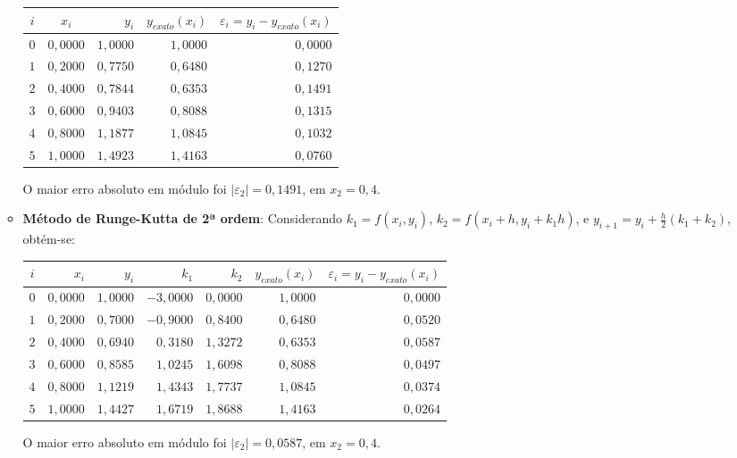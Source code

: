 \documentclass[12pt,a4paper]{article}
\begin{document}
\begin{enumerate}
\begin{itemize}
\medskip
\begin{center}
\begin{tabular}{ccrrr}
\hline
$i$ & $x_i$ & $y_i$ & $y_{exato}(x_i)$ & $\varepsilon_i = y_i-y_{exato}(x_i)$ \\ \hline
$0$ & $0,0000$ & $1,0000$ & $1,0000$ & $0,0000$ \\
$1$ & $0,2000$ & $0,7750$ & $0,6480$ & $0,1270$ \\
$2$ & $0,4000$ & $0,7844$ & $0,6353$ & $0,1491$ \\
$3$ & $0,6000$ & $0,9403$ & $0,8088$ & $0,1315$ \\
$4$ & $0,8000$ & $1,1877$ & $1,0845$ & $0,1032$ \\
$5$ & $1,0000$ & $1,4923$ & $1,4163$ & $0,0760$ \\
\hline
\end{tabular}
\end{center}
\medskip
O maior erro absoluto em módulo foi $|\varepsilon_2| = 0,1491$, em $x_2 = 0,4$.

\item \textbf{Método de Runge-Kutta de 2ª ordem}: Considerando
$k_1 = f(x_i, y_i)$,
$k_2 = f(x_i + h, y_i + k_1 h)$, e
$y_{i+1} = y_i + \frac{h}{2} (k_1 + k_2)$, obtém-se:
\medskip
\begin{center}
    \begin{tabular}{crrrrrr}
    \hline
      $i$ & $x_i$  & $y_i$ & $k_1$ & $k_2$ & $y_{exato}(x_i)$
      & $\varepsilon_i = y_i-y_{exato}(x_i)$ \\ \hline
    $0$ & $0,0000$ & $1,0000$ & $-3,0000$ & $0,0000$ & $1,0000$ & $0,0000$ \\
    $1$ & $0,2000$ & $0,7000$ & $-0,9000$ & $0,8400$ & $0,6480$ & $0,0520$ \\
    $2$ & $0,4000$ & $0,6940$ & $ 0,3180$ & $1,3272$ & $0,6353$ & $0,0587$ \\
    $3$ & $0,6000$ & $0,8585$ & $ 1,0245$ & $1,6098$ & $0,8088$ & $0,0497$ \\
    $4$ & $0,8000$ & $1,1219$ & $ 1,4343$ & $1,7737$ & $1,0845$ & $0,0374$ \\
    $5$ & $1,0000$ & $1,4427$ & $ 1,6719$ & $1,8688$ & $1,4163$ & $0,0264$ \\
    \hline
    \end{tabular}
\end{center}
\medskip
O maior erro absoluto em módulo foi $|\varepsilon_2| = 0,0587$, em $x_2 = 0,4$.


\end{itemize}
\end{enumerate}
\end{document}
